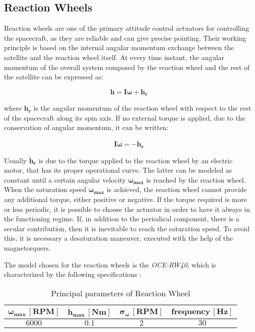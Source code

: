 \subsection{Reaction Wheels}
\label{subsec:reaction_wheels}

Reaction wheels are one of the primary attitude control actuators for controlling the spacecraft, as they are reliable and can give precise pointing. Their working principle is based on the internal angular momentum exchange between the satellite and the reaction wheel itself. At every time instant, the  angular momentum of the overall system composed by the reaction wheel and the rest of the satellite can be expressed as:

\begin{equation}
	\boldsymbol{h}=\boldsymbol{I}\boldsymbol{\omega}+\boldsymbol{h_r}
\end{equation}

where $\boldsymbol{h_r}$ is the angular momentum of the reaction wheel with respect to the rest of the spacecraft along its spin axis.
If no external torque is applied, due to the conservation of angular momentum, it can be written:

\begin{equation}
	\boldsymbol{I}\boldsymbol{\dot{\omega}}=-\boldsymbol{\dot{h}_r}
\end{equation}

Usually $\boldsymbol{\dot{h}_r}$ is due to the torque applied to the reaction wheel by an electric motor, that has its proper operational curve. The latter can be modeled as constant until a certain angular velocity $\boldsymbol{\omega_{max}}$ is reached by the reaction wheel. When the saturation speed $\boldsymbol{\omega_{max}}$ is achieved, the reaction wheel cannot provide any additional torque, either positive or negative. If the torque required is more or less periodic, it is possible to choose the actuator in order to have it always in the functioning regime. If, in addition to the periodical component, there is a secular contribution, then it is inevitable to reach the saturation speed. To avoid this, it is necessary a desaturation maneuver, executed with the help of the magnetorquers.

The model chosen for the reaction wheels is the \textit{OCE-RW40}, which is characterized by the following specifications \cite{reactionwheel_site}:

\begin{table}[H]

    \centering
    \begin{tabular}{|c|c|c|c|}
    \hline
    $\bm{\omega_{max} \, [RPM]}$ & $\bm{\dot{h}_{max} \, [Nm]}$ & $\bm{\sigma_{\omega} \, [RPM]}$ & $\bm{frequency \, [Hz]}$\\
    \hline
    $6000$ & $0.1$ & $2$ & $30$ \\
    \hline
    \end{tabular}
    
    \caption{Principal parameters of Reaction Wheel}
    \label{table:RW}
    
\end{table}

